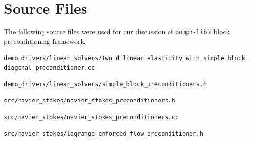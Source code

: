 \section{Source Files\label{sec:source_files}}
The following source files were used for our discussion of \verb+oomph-lib+'s block preconditioning framework.

\noindent
{\scriptsize
\verb+demo_drivers/linear_solvers/two_d_linear_elasticity_with_simple_block_diagonal_preconditioner.cc+
}

\noindent
{\scriptsize
\verb+demo_drivers/linear_solvers/simple_block_preconditioners.h+
}

\noindent
{\scriptsize
\verb+src/navier_stokes/navier_stokes_preconditioners.h+
}

\noindent
{\scriptsize
\verb+src/navier_stokes/navier_stokes_preconditioners.cc+
}

\noindent
{\scriptsize
\verb+src/navier_stokes/lagrange_enforced_flow_preconditioner.h+
}

